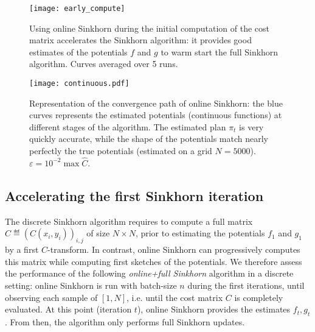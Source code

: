 \begin{figure}[t]
    \centering
    \texttt{[image: early\_compute]}
    
    \vspace{-1em}

    \caption{Using online Sinkhorn during the initial computation of the cost
     matrix accelerates the Sinkhorn algorithm: it provides good estimates of
     the potentials $f$ and $g$ to warm start the full Sinkhorn algorithm.
     Curves averaged over 5 runs. \label{fig:early_compute}}
\end{figure}

\begin{figure*}[t]
    \centering
    \if{}
    \begin{widepage}
    \fi
    \texttt{[image: continuous.pdf]}
    \caption{Representation of the convergence path of online Sinkhorn: the blue curves represents the estimated potentials (continuous functions) at different stages of the algorithm. The estimated plan $\pi_t$ is very quickly accurate, while the shape of the potentials match nearly perfectly the true potentials (estimated on a grid $N = 5000$). $\varepsilon = 10^{-2} \max \hat C$.
    \label{fig:potentials}
    }
    \if{}
    \end{widepage}
    \fi
\end{figure*}

\subsection{Accelerating the first Sinkhorn iteration}\label{sec:accelerating}

The discrete Sinkhorn algorithm requires to compute a full matrix $\hat C \eqdef
(C(x_i,y_i))_{i,j}$  of size $N \times N$, prior to estimating the
potentials $f_1$ and $g_1$ by a first $C$-transform. In contrast, online Sinkhorn can progressively
computes this matrix while computing first sketches of the potentials. We therefore
assess the performance of the following \textit{online+full Sinkhorn} algorithm
in a discrete setting: online Sinkhorn is run with batch-size $n$ during the first iterations, until
observing each sample of $[1,N]$, i.e. until the cost matrix $C$ is completely evaluated.
At this point (iteration $t$), online Sinkhorn provides the estimates $f_{t},
g_{t}$. From then, the algorithm only performs full Sinkhorn updates.


